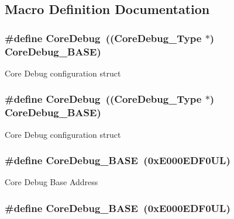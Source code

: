 \subsection{Macro Definition Documentation}
\hypertarget{group___c_m_s_i_s__core__register_gab6e30a2b802d9021619dbb0be7f5d63d}{
\subsubsection[{Core\-Debug}]{\setlength{\rightskip}{0pt plus 5cm}\#define Core\-Debug~(({\bf Core\-Debug\-\_\-\-Type} $\ast$)     {\bf Core\-Debug\-\_\-\-B\-A\-S\-E})}}\label{group___c_m_s_i_s__core__register_gab6e30a2b802d9021619dbb0be7f5d63d}
Core Debug configuration struct \hypertarget{group___c_m_s_i_s__core__register_gab6e30a2b802d9021619dbb0be7f5d63d}{
\subsubsection[{Core\-Debug}]{\setlength{\rightskip}{0pt plus 5cm}\#define Core\-Debug~(({\bf Core\-Debug\-\_\-\-Type} $\ast$)     {\bf Core\-Debug\-\_\-\-B\-A\-S\-E})}}\label{group___c_m_s_i_s__core__register_gab6e30a2b802d9021619dbb0be7f5d63d}
Core Debug configuration struct \hypertarget{group___c_m_s_i_s__core__register_ga680604dbcda9e9b31a1639fcffe5230b}{
\subsubsection[{Core\-Debug\-\_\-\-B\-A\-S\-E}]{\setlength{\rightskip}{0pt plus 5cm}\#define Core\-Debug\-\_\-\-B\-A\-S\-E~(0x\-E000\-E\-D\-F0\-U\-L)}}\label{group___c_m_s_i_s__core__register_ga680604dbcda9e9b31a1639fcffe5230b}
Core Debug Base Address \hypertarget{group___c_m_s_i_s__core__register_ga680604dbcda9e9b31a1639fcffe5230b}{
\subsubsection[{Core\-Debug\-\_\-\-B\-A\-S\-E}]{\setlength{\rightskip}{0pt plus 5cm}\#define Core\-Debug\-\_\-\-B\-A\-S\-E~(0x\-E000\-E\-D\-F0\-U\-L)}}\label{group___c_m_s_i_s__core__register_ga680604dbcda9e9b31a1639fcffe5230b}
